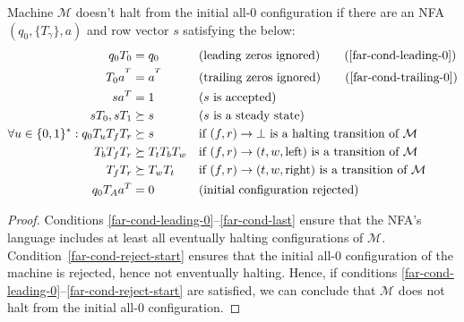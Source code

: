 \begin{theorem}\normalfont
  \label{far-main-theorem}
  Machine $\mathcal{M}$ doesn't halt from the initial all-0 configuration if there are an NFA $(q_0, \{T_\gamma\}, a)$ and row vector $s$ satisfying the below:
  \begin{align}
    \label{far-cond-first}
    q_0 T_0                                & = q_0
                                           &                     & \text{(leading zeros ignored)}
    \tag{\ref{far-cond-leading-0}}
    \\
    T_0a^{\T}                              & = a^{\T}
                                           &                     & \text{(trailing zeros ignored)}
    \tag{\ref{far-cond-trailing-0}}
    \\
    sa\T                                   & = 1
                                           &                     & \text{($s$ is accepted)}
    \label{far-cond-ass-accepted}
    \\
    sT_0,sT_1                              & \succeq s
                                           &                     & \text{($s$ is a steady state)}
    \label{far-cond-ass-steady}
    \\
    \forall u\in\{0, 1\}^*: q_0T_u T_f T_r & \succeq s
                                           &                     & \text{if $(f,r) \to \bot$ is a halting transition of $\mathcal{M}$}
    \label{far-cond-halt}
    \\
    T_b T_f T_r                            & \succeq T_t T_b T_w
                                           &                     & \text{if $(f,r) \to (t,w,\text{left})$ is a transition of $\mathcal{M}$}
    \label{far-cond-left}
    \\
    T_f T_r                                & \succeq T_w T_t
                                           &                     & \text{if $(f,r) \to (t,w,\text{right})$ is a transition of $\mathcal{M}$}
    \label{far-cond-last}
    \\
    q_0 T_A a\T                            & = 0
                                           &                     & \text{(initial configuration rejected)}
    \label{far-cond-reject-start}
  \end{align}
\end{theorem}
\begin{proof}
  Conditions \eqref{far-cond-leading-0}--\eqref{far-cond-last} ensure that the NFA's language includes at least all eventually halting configurations of $\mathcal{M}$. Condition~\eqref{far-cond-reject-start} ensures that the initial all-0 configuration of the machine is rejected, hence not enventually halting. Hence, if conditions \eqref{far-cond-leading-0}--\eqref{far-cond-reject-start} are satisfied, we can conclude that $\mathcal{M}$ does not halt from the initial all-0 configuration.
\end{proof}


